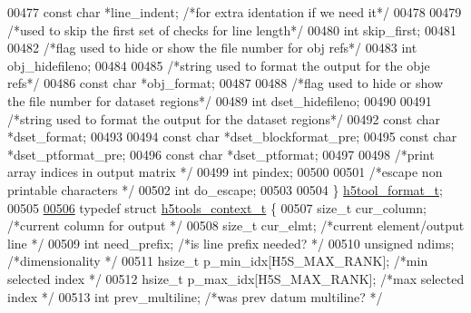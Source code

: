 \begin{DoxyCode}
{{{{{{{{{{{{{{{{{{{00477     \textcolor{keyword}{const} \textcolor{keywordtype}{char}  *line\_indent;           \textcolor{comment}{/*for extra identation if we need it*/}
00478 
00479     \textcolor{comment}{/*used to skip the first set of checks for line length*/}
00480     \textcolor{keywordtype}{int} skip\_first;
00481 
00482     \textcolor{comment}{/*flag used to hide or show the file number for obj refs*/}
00483     \textcolor{keywordtype}{int} obj\_hidefileno;
00484 
00485     \textcolor{comment}{/*string used to format the output for the obje refs*/}
00486     \textcolor{keyword}{const} \textcolor{keywordtype}{char} *obj\_format;
00487 
00488     \textcolor{comment}{/*flag used to hide or show the file number for dataset regions*/}
00489     \textcolor{keywordtype}{int} dset\_hidefileno;
00490 
00491     \textcolor{comment}{/*string used to format the output for the dataset regions*/}
00492     \textcolor{keyword}{const} \textcolor{keywordtype}{char} *dset\_format;
00493 
00494     \textcolor{keyword}{const} \textcolor{keywordtype}{char} *dset\_blockformat\_pre;
00495     \textcolor{keyword}{const} \textcolor{keywordtype}{char} *dset\_ptformat\_pre;
00496     \textcolor{keyword}{const} \textcolor{keywordtype}{char} *dset\_ptformat;
00497 
00498     \textcolor{comment}{/*print array indices in output matrix */}
00499     \textcolor{keywordtype}{int} pindex;
00500 
00501     \textcolor{comment}{/*escape non printable characters */}
00502     \textcolor{keywordtype}{int} do\_escape;
00503 
00504 \} \hyperlink{structh5tool__format__t}{h5tool\_format\_t};
00505 
\hyperlink{structh5tools__context__t}{00506} \textcolor{keyword}{typedef} \textcolor{keyword}{struct }\hyperlink{structh5tools__context__t}{h5tools\_context\_t} \{
00507     \textcolor{keywordtype}{size\_t} cur\_column;                       \textcolor{comment}{/*current column for output */}
00508     \textcolor{keywordtype}{size\_t} cur\_elmt;                         \textcolor{comment}{/*current element/output line */}
00509     \textcolor{keywordtype}{int}  need\_prefix;                        \textcolor{comment}{/*is line prefix needed? */}
00510     \textcolor{keywordtype}{unsigned} ndims;                          \textcolor{comment}{/*dimensionality  */}
00511     hsize\_t p\_min\_idx[H5S\_MAX\_RANK];         \textcolor{comment}{/*min selected index */}
00512     hsize\_t p\_max\_idx[H5S\_MAX\_RANK];         \textcolor{comment}{/*max selected index */}
00513     \textcolor{keywordtype}{int}  prev\_multiline;                     \textcolor{comment}{/*was prev datum multiline? */}
}}}}}}}}}}}}}}}}}}}
\end{DoxyCode}
